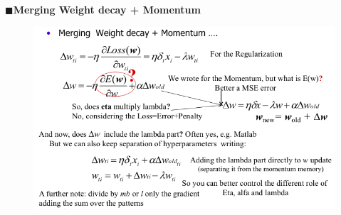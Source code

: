 \documentclass[../main.tex]{subfiles}
\begin{document}
\noindent $\blacksquare$\textbf{Merging Weight decay + Momentum}
\begin{figure}[H]
    \centering
    \includegraphics[scale = 0.4]{lectures/4_neural_networks/4_mom_reg.png}
    \label{fig:4_mom_reg}
\end{figure}
\end{document}
